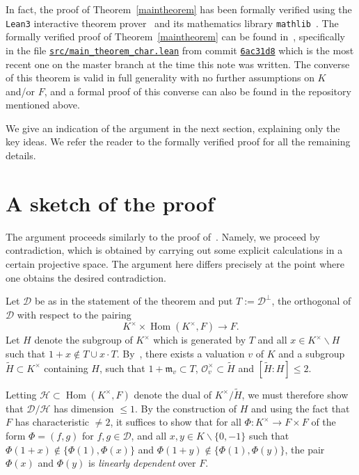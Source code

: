 \documentclass[12pt]{amsart}
\newcommand{\Hom}{\operatorname{Hom}}
\newcommand{\Dcal}{\mathcal{D}}
\newcommand{\smin}{\smallsetminus}
\newcommand{\mfrak}{\mathfrak{m}}
\newcommand{\Ocal}{\mathcal{O}}
\newcommand{\Hcal}{\mathcal{H}}
\renewcommand{\tilde}{\widetilde}
\begin{document}
In fact, the proof of Theorem~\ref{maintheorem} has been formally verified using the \texttt{Lean3} interactive theorem prover~\cite{10.1007/978-3-319-21401-6_26} and its mathematics library \texttt{mathlib}~\cite{10.1145/3372885.3373824}.
The formally verified proof of Theorem~\ref{maintheorem} can be found in~\cite{lean-acl-pairs}, specifically in the file \href{https://github.com/adamtopaz/lean-acl-pairs/blob/6ac31d86ca2739b6c18d3f05b7007e720f66299f/src/main_theorem_char.lean}{\texttt{src/main\_theorem\_char.lean}} from commit \href{https://github.com/adamtopaz/lean-acl-pairs/tree/6ac31d86ca2739b6c18d3f05b7007e720f66299f}{\texttt{6ac31d8}} which is the most recent one on the master branch at the time this note was written.
The converse of this theorem is valid in full generality with no further assumptions on $K$ and/or $F$, and a formal proof of this converse can also be found in the repository mentioned above.

We give an indication of the argument in the next section, explaining only the key ideas.
We refer the reader to the formally verified proof for all the remaining details.

\section{A sketch of the proof}

The argument proceeds similarly to the proof of~\cite[Theorem~A.3]{https://doi.org/10.48550/arxiv.1705.01084}.
Namely, we proceed by contradiction, which is obtained by carrying out some explicit calculations in a certain projective space.
The argument here differs precisely at the point where one obtains the desired contradiction.

Let $\Dcal$ be as in the statement of the theorem and put $T := \Dcal^{\perp}$, the orthogonal of $\Dcal$ with respect to the pairing
\[ K^{\times} \times \Hom(K^{\times},F) \to F. \]
Let $H$ denote the subgroup of $K^{\times}$ which is generated by $T$ and all $x \in K^{\times} \smin H$ such that $1 + x \notin T \cup x \cdot T$.
By~\cite[Theorem 2.16]{zbMATH04023378}, there exists a valuation $v$ of $K$ and a subgroup $\tilde H \subset K^{\times}$ containing $H$, such that $1 + \mfrak_{v} \subset T$, $\Ocal_{v}^{\times} \subset \tilde H$ and $[\tilde H : H] \le 2$.

Letting $\Hcal \subset \Hom(K^{\times},F)$ denote the dual of $K^{\times}/\tilde H$, we must therefore show that $\Dcal/\Hcal$ has dimension $\le 1$.
By the construction of $H$ and using the fact that $F$ has characteristic $\neq 2$, it suffices to show that for all $\Phi : K^{\times} \to F \times F$ of the form $\Phi = (f,g)$ for $f,g \in \Dcal$, and all $x,y \in K \smin \{0,-1\}$ such that $\Phi(1+x) \notin \{\Phi(1),\Phi(x)\}$ and $\Phi(1+y) \notin \{\Phi(1),\Phi(y)\}$, the pair $\Phi(x)$ and $\Phi(y)$ is \emph{linearly dependent} over $F$.
\end{document}
